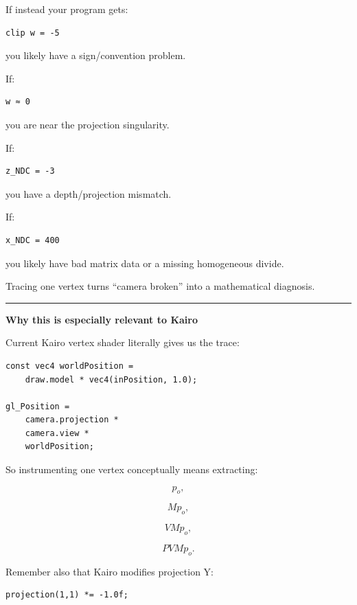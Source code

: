 If instead your program gets:

\begin{verbatim}
clip w = -5
\end{verbatim}

you likely have a sign/convention problem.

If:

\begin{verbatim}
w ≈ 0
\end{verbatim}

you are near the projection singularity.

If:

\begin{verbatim}
z_NDC = -3
\end{verbatim}

you have a depth/projection mismatch.

If:

\begin{verbatim}
x_NDC = 400
\end{verbatim}

you likely have bad matrix data or a missing homogeneous divide.

Tracing one vertex turns ``camera broken'' into a mathematical diagnosis.

\begin{center}\rule{0.5\linewidth}{0.5pt}\end{center}

\textbf{Why this is especially relevant to Kairo}

Current Kairo vertex shader literally gives us the trace:

\begin{verbatim}
const vec4 worldPosition =
    draw.model * vec4(inPosition, 1.0);

gl_Position =
    camera.projection *
    camera.view *
    worldPosition;
\end{verbatim}

So instrumenting one vertex conceptually means extracting:

\[
p_o,
\]

\[
M p_o,
\]

\[
V M p_o,
\]

\[
PVMp_o.
\]

Remember also that Kairo modifies projection Y:

\begin{verbatim}
projection(1,1) *= -1.0f;
\end{verbatim}

